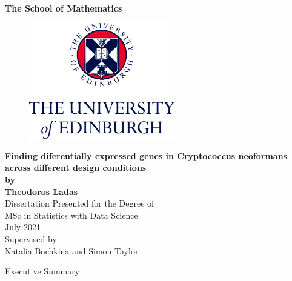\documentclass[11pt,twoside]{article}
\numberwithin{Theorem}{section}
\numberwithin{Definition}{section}
\numberwithin{Lemma}{section}
\numberwithin{Algorithm}{section}
\numberwithin{equation}{section}
\begin{document}
\pagestyle{empty}

\begin{titlepage}
\vspace*{.5em}
\center
\textbf{\Large{The School of Mathematics}} \\
\vspace*{1em}
\begin{figure}[!h]
\centering
\includegraphics[width=180pt]{CentredLogoCMYK.jpg}
\end{figure}
\vspace{2em}
\textbf{\Huge{Finding diferentially expressed genes in Cryptococcus neoformans across different design conditions}}\\[2em]
\textbf{\LARGE{by}}\\
\vspace{2em}
\textbf{\LARGE{Theodoros Ladas}}\\
\vspace{6.5em}
\Large{Dissertation Presented for the Degree of\\
MSc in Statistics with Data Science}\\
\vspace{6.5em}
\Large{July 2021}\\
\vspace{3em}
\Large{Supervised by\\Natalia Bochkina and Simon Taylor}
\vfill
\end{titlepage}

\cleardoublepage

\begin{center}
\Large{Executive Summary}
\end{center}
\end{document}
